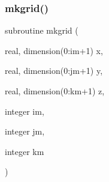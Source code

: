 \mbox{\label{rad__main_8f_a257f7cef7cb961317e0772d235bd8af1}} 
\subsubsection{\texorpdfstring{mkgrid()}{mkgrid()}}
{\footnotesize\ttfamily subroutine mkgrid (\begin{DoxyParamCaption}\item[{real, dimension(0\+:im+1)}]{x,  }\item[{real, dimension(0\+:jm+1)}]{y,  }\item[{real, dimension(0\+:km+1)}]{z,  }\item[{integer}]{im,  }\item[{integer}]{jm,  }\item[{integer}]{km }\end{DoxyParamCaption})}

